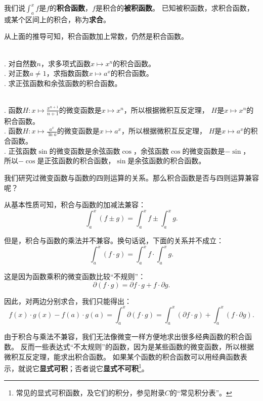 \documentclass[12pt,UTF8]{ctexbook}
\begin{document}
我们说$\int_a^x f$是$f$的\textbf{积合函数}，$f$是积合的\textbf{被积函数}。
已知被积函数，求积合函数，或某个区间上的积合，称为\textbf{求合}。

从上面的推导可知，积合函数加上常数，仍然是积合函数。

\begin{et}
    \mbox{} \\
    . 对自然数$n$，求多项式函数$x\mapsto x^n$的积合函数。\\
    . 对正数$a\neq 1$，求指数函数$x\mapsto a^x$的积合函数。\\
    . 求正弦函数和余弦函数的积合函数。
\end{et}

\begin{so}
    \mbox{} \\
    . 函数$H: x\mapsto \frac{x^{n+1}}{n+1}$的微变函数是$x\mapsto x^n$，所以根据微积互反定理，
    $H$是$x\mapsto x^n$的积合函数。\\
    . 函数$H: x\mapsto \frac{a^x}{\ln{a}}$的微变函数是$x\mapsto a^x$，所以根据微积互反定理，
    $H$是$x\mapsto a^x$的积合函数。\\
    . 正弦函数$\sin$的微变函数是余弦函数$\cos$，余弦函数$\cos$的微变函数是$-\sin$，
    所以$-\cos$是正弦函数的积合函数，$\sin$是余弦函数的积合函数。
\end{so}

我们研究过微变函数与函数的四则运算的关系。那么积合函数是否与四则运算兼容呢？

从基本性质可知，积合与函数的加减法兼容：
$$ \int_a^x (f \pm g) = \int_a^x f \pm \int_a^x g. $$

但是，积合与函数的乘法并不兼容。换句话说，下面的关系并不成立：
$$ \int_a^x (f \cdot g) = \int_a^x f \cdot \int_a^x g. $$

这是因为函数乘积的微变函数比较“不规则”：
$$ \partial (f\cdot g) = \partial f \cdot g + f \cdot \partial g.$$

因此，对两边分别求合，我们只能得出：
$$ f(x)\cdot g(x) - f(a)\cdot g(a) = \int_a^x \partial (f\cdot g) = \int_a^x (\partial f \cdot g) + \int_a^x (f \cdot \partial g). $$

由于积合与乘法不兼容，我们无法像微变一样方便地求出很多经典函数的积合函数。
反而一些表达式“不太规则”的函数，因为是某些函数的微变函数，所以根据微积互反定理，能求出积合函数。
如果某个函数的积合函数可以用经典函数表示，就说它\textbf{显式可积}；否者说它\textbf{显式不可积}\footnote{常见的显式可积函数，及它们的积分，参见附录$C$的“常见积分表”。}。
\end{document}

